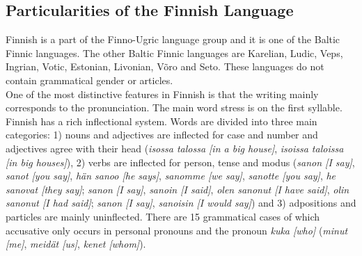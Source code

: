 \begin{multicols}{2}
\subsection{Particularities of the Finnish Language}

Finnish is a part of the Finno-Ugric language group and it is one of the Baltic
Finnic languages. The other Baltic Finnic languages are Karelian, Ludic, Veps,
Ingrian, Votic, Estonian, Livonian, Võro and Seto. These languages do not
contain grammatical gender or articles.\\
One of the most distinctive features in Finnish is that the writing mainly
corresponds to the pronunciation. The main word stress is on the first
syllable.\\
Finnish has a rich inflectional system. Words are divided into three main
categories: 1) nouns and adjectives are inflected for case and number and
adjectives agree with their head
(\textit{\foreignlanguage{finnish}{\textit{isossa talossa}} [in a big house]},
 \textit{\foreignlanguage{finnish}{\textit{isoissa taloissa}}
         [in big houses]}),
2) verbs are inflected for person, tense and modus
(\textit{\foreignlanguage{finnish}{\textit{sanon}} [I say]},
 \textit{\foreignlanguage{finnish}{\textit{sanot}} [you say]},
 \textit{\foreignlanguage{finnish}{\textit{hän sanoo}} [he says]},
 \textit{\foreignlanguage{finnish}{\textit{sanomme}} [we say]},
 \textit{\foreignlanguage{finnish}{\textit{sanotte}} [you say]},
 \textit{\foreignlanguage{finnish}{\textit{he sanovat}} [they say]};
 \textit{\foreignlanguage{finnish}{\textit{sanon}} [I say]},
 \textit{\foreignlanguage{finnish}{\textit{sanoin}} [I said]},
 \textit{\foreignlanguage{finnish}{\textit{olen sanonut}} [I have said]},
 \textit{\foreignlanguage{finnish}{\textit{olin sanonut}} [I had said]};
 \textit{\foreignlanguage{finnish}{\textit{sanon}} [I say]},
 \textit{\foreignlanguage{finnish}{\textit{sanoisin}} [I would say]})
 and 3) adpositions and particles are mainly uninflected. There are 15
grammatical cases of which accusative only occurs in personal pronouns and the
pronoun
\textit{\foreignlanguage{finnish}{\textit{kuka}} [who]} %
 (\textit{\foreignlanguage{finnish}{\textit{minut}} [me]},
  \textit{\foreignlanguage{finnish}{\textit{meidät}} [us]},
  \textit{\foreignlanguage{finnish}{\textit{kenet}} [whom]}).


\end{multicols}
